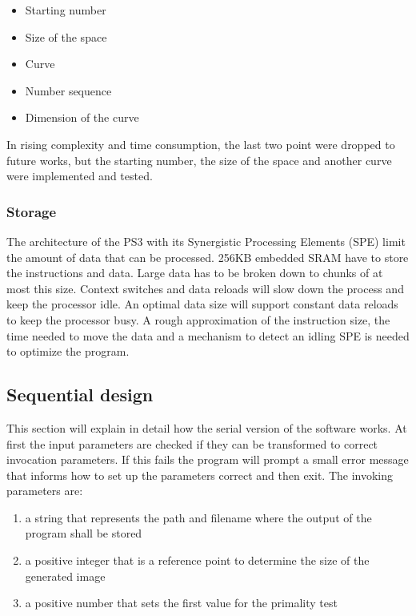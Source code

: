 \begin{itemize}%
   \item Starting number
   \item Size of the space
   \item Curve
   \item Number sequence
   \item Dimension of the curve   
\end{itemize}%

In rising complexity and time consumption, the last two point were dropped to future works, but the starting number, the size of the space and another curve were implemented and tested.

\subsubsection{Storage}
\label{sec:concurrency}
The architecture of the PS3 with its Synergistic Processing Elements (SPE) limit the amount of data that can be processed. 256KB embedded SRAM have to store the instructions and data.\cite{PTC}
Large data has to be broken down to chunks of at most this size. Context switches and data reloads will slow down the process and keep the processor idle. An optimal data size will support constant data reloads to keep the processor busy. A rough approximation of the instruction size, the time needed to move the data and a mechanism to detect an idling SPE is needed to optimize the program.

\subsection{Sequential design}
\label{sec:serial_design}
This section will explain in detail how the serial version of the software works.
At first the input parameters are checked if they can be transformed to correct invocation parameters. If this fails the program will prompt a small error message that informs how to set up the parameters correct and then exit.
The invoking parameters are:

\begin{enumerate}
   \item a string that represents the path and filename where the output of the program shall be stored
   \item a positive integer that is a reference point to determine the size of the generated image
   \item a positive number that sets the first value for the primality test
\end{enumerate}

